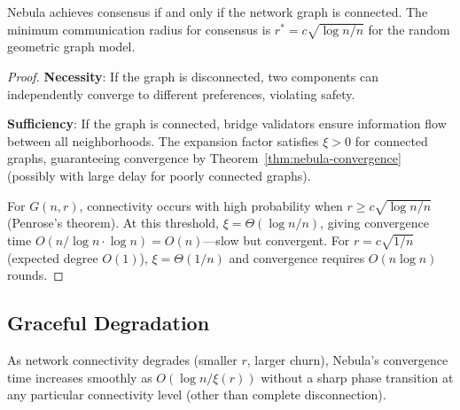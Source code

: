 \begin{lemma}
\label{lem:connectivity}
Nebula achieves consensus if and only if the network graph is connected. The minimum
communication radius for consensus is $r^* = c\sqrt{\log n / n}$ for the random
geometric graph model.
\end{lemma}

\begin{proof}
\textbf{Necessity}: If the graph is disconnected, two components can independently
converge to different preferences, violating safety.

\textbf{Sufficiency}: If the graph is connected, bridge validators ensure information
flow between all neighborhoods. The expansion factor satisfies $\xi > 0$ for connected
graphs, guaranteeing convergence by Theorem~\ref{thm:nebula-convergence} (possibly with
large delay for poorly connected graphs).

For $G(n, r)$, connectivity occurs with high probability when $r \geq c\sqrt{\log n / n}$
(Penrose's theorem). At this threshold, $\xi = \Theta(\log n / n)$, giving convergence
time $O(n / \log n \cdot \log n) = O(n)$---slow but convergent. For $r = c\sqrt{1/n}$
(expected degree $O(1)$), $\xi = \Theta(1/n)$ and convergence requires $O(n \log n)$ rounds.
\end{proof}

\subsection{Graceful Degradation}

\begin{corollary}
\label{cor:graceful}
As network connectivity degrades (smaller $r$, larger churn), Nebula's convergence
time increases smoothly as $O(\log n / \xi(r))$ without a sharp phase transition
at any particular connectivity level (other than complete disconnection).
\end{corollary}

